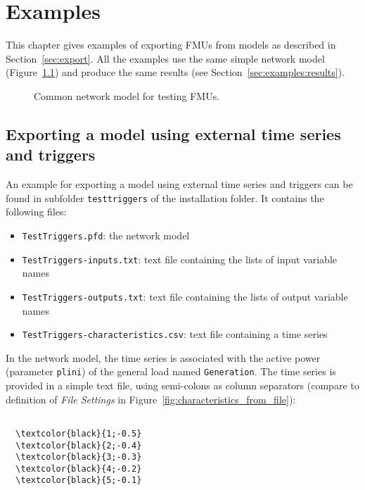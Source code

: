 
\chapter{Examples}
\label{sec:examples}

This chapter gives examples of exporting FMUs from \pf models as described in Section~\ref{sec:export}.
All the examples use the same simple network model (Figure~\ref{fig:test_model}) and produce the same results (see Section~\ref{sec:examples:results}).

\begin{figure}[h!]
\vspace*{2em}
\caption{Common network model for testing FMUs.}
\label{fig:test_model}
\end{figure}


\section{Exporting a model using external time series and triggers}
\label{sec:examples:triggers}

An example for exporting a model using external time series and triggers can be found in subfolder \texttt{testtriggers} of the installation folder.
It contains the following files:
\begin{itemize}
  \item \texttt{TestTriggers.pfd}: the \pf network model
  \item \texttt{TestTriggers-inputs.txt}: text file containing the lists of input variable names
  \item \texttt{TestTriggers-outputs.txt}: text file containing the lists of output variable names
  \item \texttt{TestTriggers-characteristics.csv}: text file containing a time series
\end{itemize}
In the network model, the time series is associated with the active power (parameter \texttt{plini}) of the general load named \texttt{Generation}. The time series is provided in a simple text file, using semi-colons as column separators (compare to definition of \emph{File Settings} in Figure~\ref{fig:characteristics_from_file}):
\begin{Verbatim}[frame=single,commandchars=\\\{\}]

  \textcolor{black}{1;-0.5}
  \textcolor{black}{2;-0.4}
  \textcolor{black}{3;-0.3}
  \textcolor{black}{4;-0.2}
  \textcolor{black}{5;-0.1}

\end{Verbatim}


